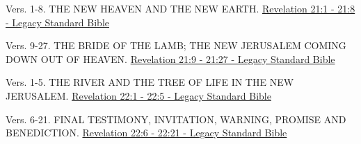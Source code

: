 \documentclass[
  ignorenonframetext,
]{beamer}
\begin{document}
\begin{frame}{21}
\label{section-274}
\begin{block}{Vers. 1-8. THE NEW HEAVEN AND THE NEW EARTH.}
\label{vers.-1-8.-the-new-heaven-and-the-new-earth.}
\href{https://read.lsbible.org/?q=rev21\%3A1-8}{Revelation 21:1 - 21:8 -
Legacy Standard Bible}
\end{block}

\begin{block}{Vers. 9-27. THE BRIDE OF THE LAMB; THE NEW JERUSALEM
COMING DOWN OUT OF HEAVEN.}
\label{vers.-9-27.-the-bride-of-the-lamb-the-new-jerusalem-coming-down-out-of-heaven.}
\href{https://read.lsbible.org/?q=rev21\%3A9-27}{Revelation 21:9 - 21:27
- Legacy Standard Bible}
\end{block}
\end{frame}

\begin{frame}{22}
\label{section-275}
\begin{block}{Vers. 1-5. THE RIVER AND THE TREE OF LIFE IN THE NEW
JERUSALEM.}
\label{vers.-1-5.-the-river-and-the-tree-of-life-in-the-new-jerusalem.}
\href{https://read.lsbible.org/?q=rev22\%3A1-5}{Revelation 22:1 - 22:5 -
Legacy Standard Bible}
\end{block}

\begin{block}{Vers. 6-21. FINAL TESTIMONY, INVITATION, WARNING, PROMISE
AND BENEDICTION.}
\label{vers.-6-21.-final-testimony-invitation-warning-promise-and-benediction.}
\href{https://read.lsbible.org/?q=rev22\%3A6-21}{Revelation 22:6 - 22:21
- Legacy Standard Bible}
\end{block}
\end{frame}
\end{document}
